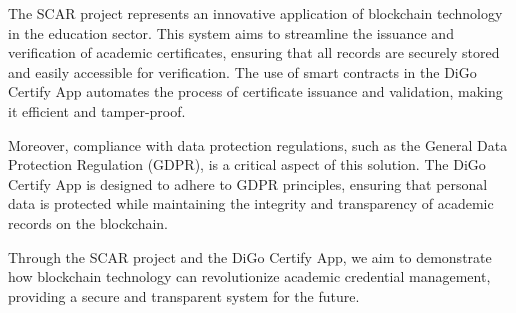 The SCAR project represents an innovative application of blockchain technology in the education sector. This system aims to streamline the issuance and verification of academic certificates, ensuring that all records are securely stored and easily accessible for verification. The use of smart contracts in the DiGo Certify App automates the process of certificate issuance and validation, making it efficient and tamper-proof.

Moreover, compliance with data protection regulations, such as the General Data Protection Regulation (GDPR), is a critical aspect of this solution. The DiGo Certify App is designed to adhere to GDPR principles, ensuring that personal data is protected while maintaining the integrity and transparency of academic records on the blockchain.

Through the SCAR project and the DiGo Certify App, we aim to demonstrate how blockchain technology can revolutionize academic credential management, providing a secure and transparent system for the future.


